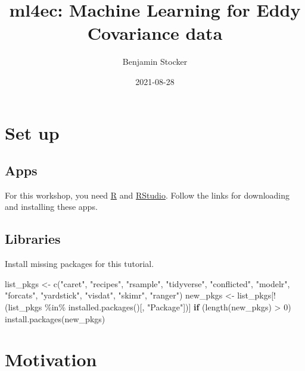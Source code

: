 \documentclass[
]{book}
\title{ml4ec: Machine Learning for Eddy Covariance data}
\author{Benjamin Stocker}
\date{2021-08-28}
\newenvironment{Shaded}{\begin{snugshade}}{\end{snugshade}}
\newcommand{\ControlFlowTok}[1]{\textcolor[rgb]{0.13,0.29,0.53}{\textbf{#1}}}
\newcommand{\DecValTok}[1]{\textcolor[rgb]{0.00,0.00,0.81}{#1}}
\newcommand{\FunctionTok}[1]{\textcolor[rgb]{0.00,0.00,0.00}{#1}}
\newcommand{\NormalTok}[1]{#1}
\newcommand{\OtherTok}[1]{\textcolor[rgb]{0.56,0.35,0.01}{#1}}
\newcommand{\SpecialCharTok}[1]{\textcolor[rgb]{0.00,0.00,0.00}{#1}}
\newcommand{\StringTok}[1]{\textcolor[rgb]{0.31,0.60,0.02}{#1}}
\begin{document}
\maketitle

{
\setcounter{tocdepth}{1}
\tableofcontents
}
\hypertarget{set-up}{%
\chapter{Set up}\label{set-up}}

\hypertarget{apps}{%
\section{Apps}\label{apps}}

For this workshop, you need \href{https://www.r-project.org/}{R} and \href{https://www.rstudio.com/products/rstudio/download/}{RStudio}. Follow the links for downloading and installing these apps.

\hypertarget{libraries}{%
\section{Libraries}\label{libraries}}

Install missing packages for this tutorial.

\begin{Shaded}
\begin{Highlighting}[]
\NormalTok{list\_pkgs }\OtherTok{\textless{}{-}} \FunctionTok{c}\NormalTok{(}\StringTok{"caret"}\NormalTok{, }\StringTok{"recipes"}\NormalTok{, }\StringTok{"rsample"}\NormalTok{, }\StringTok{"tidyverse"}\NormalTok{, }\StringTok{"conflicted"}\NormalTok{, }\StringTok{"modelr"}\NormalTok{, }\StringTok{"forcats"}\NormalTok{, }\StringTok{"yardstick"}\NormalTok{, }\StringTok{"visdat"}\NormalTok{, }\StringTok{"skimr"}\NormalTok{, }\StringTok{"ranger"}\NormalTok{)}
\NormalTok{new\_pkgs }\OtherTok{\textless{}{-}}\NormalTok{ list\_pkgs[}\SpecialCharTok{!}\NormalTok{(list\_pkgs }\SpecialCharTok{\%in\%} \FunctionTok{installed.packages}\NormalTok{()[, }\StringTok{"Package"}\NormalTok{])]}
\ControlFlowTok{if}\NormalTok{ (}\FunctionTok{length}\NormalTok{(new\_pkgs) }\SpecialCharTok{\textgreater{}} \DecValTok{0}\NormalTok{) }\FunctionTok{install.packages}\NormalTok{(new\_pkgs)}
\end{Highlighting}
\end{Shaded}

\hypertarget{motivation}{%
\chapter{Motivation}\label{motivation}}
\end{document}
